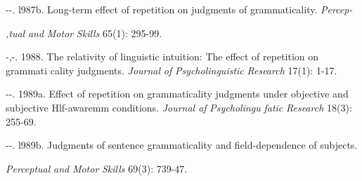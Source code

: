 \begin{listWWNumivleveli}
\item 
\begin{styleStandard}
{}-{}-. l987b. Long-term effect of repetition on judgments of grammaticality. \textit{Percep-}
\end{styleStandard}


\begin{listWWNumivlevelii}
\item 
\begin{styleStandard}
\textit{,tual}\textit{ }\textit{and}\textit{ }\textit{Motor}\textit{ }\textit{Skills}\textit{ }65(1): 295-99.
\end{styleStandard}


\end{listWWNumivlevelii}
\item 
\begin{styleStandard}
{}-,{}-. 1988. The relativity of linguistic intuition: The effect of repetition on grammati\- cality judgments. \textit{Journal}\textit{ }\textit{of}\textit{ }\textit{Psycholinguistic}\textit{ }\textit{Research}\textit{ }17(1): 1-17.
\end{styleStandard}


\item 
\begin{styleStandard}
{}-{}-. 1989a. Effect of repetition on grammaticality judgments under objective and subjective Hlf-awaremm conditions. \textit{Journal af}\textit{ }\textit{Psycholingu}\textit{ }\textit{fatic}\textit{ }\textit{Research}\textit{ }18(3): 255-69.
\end{styleStandard}


\item 
\begin{styleStandard}
{}-{}-. l989b. Judgments of sentence grammaticality and field-dependence of subjects.
\end{styleStandard}


\end{listWWNumivleveli}
\begin{styleStandard}
\textit{Perceptual}\textit{ }\textit{and}\textit{ }\textit{Motor}\textit{ }\textit{Skills}\textit{ }69(3): 739-47.
\end{styleStandard}



